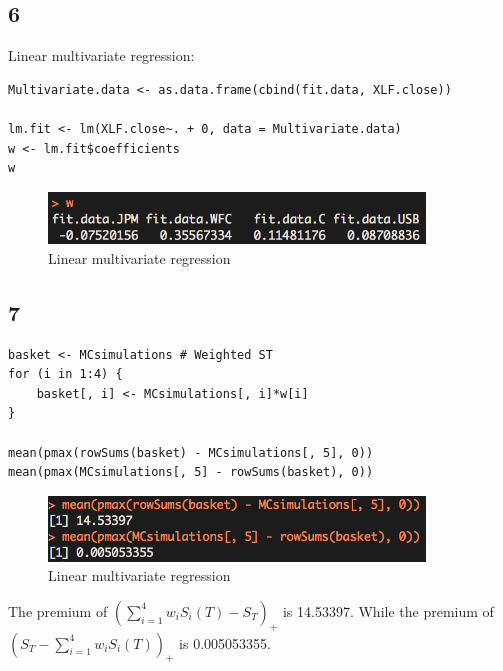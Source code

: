 \documentclass{article}
\begin{document}
\subsection{6}
Linear multivariate regression:
\begin{verbatim}
Multivariate.data <- as.data.frame(cbind(fit.data, XLF.close))

lm.fit <- lm(XLF.close~. + 0, data = Multivariate.data)
w <- lm.fit$coefficients
w
\end{verbatim}

\begin{figure}[h] 
\begin{center} 
\includegraphics[width = 10cm]{reg.png}  
\caption{Linear multivariate regression} 
\end{center} 
\end{figure}

\subsection{7}
\begin{verbatim}
basket <- MCsimulations # Weighted ST
for (i in 1:4) {
    basket[, i] <- MCsimulations[, i]*w[i]
}

mean(pmax(rowSums(basket) - MCsimulations[, 5], 0))
mean(pmax(MCsimulations[, 5] - rowSums(basket), 0))
\end{verbatim}

\begin{figure}[h] 
\begin{center} 
\includegraphics[width = 10cm]{P27.png}  
\caption{Linear multivariate regression} 
\end{center} 
\end{figure}

The premium of ${(\sum\limits_{i = 1}^4 {{w_i}{S_i}(T) - {S_T}} )_ + }$ is 14.53397. While the premium of ${({S_T} - \sum\limits_{i = 1}^4 {{w_i}{S_i}(T)} )_ + }$ is 0.005053355.
\end{document}
